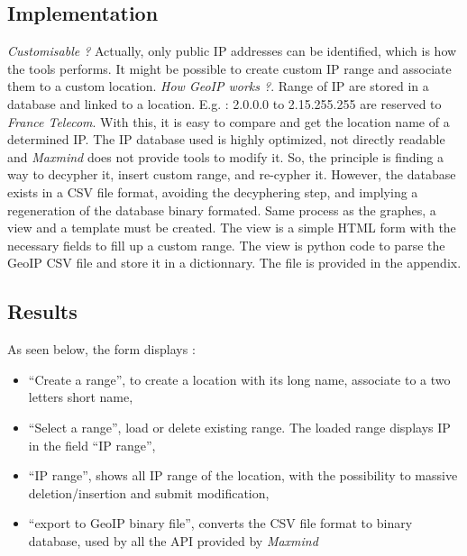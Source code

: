 \documentclass{koala-en}
\begin{document}
\subsection{Implementation}
\emph{Customisable ?}
Actually, only public IP addresses can be identified, which is how the tools performs. It might be possible to create custom IP range and associate them to a custom location.
\newline
\newline
\emph{How GeoIP works ?}. Range of IP are stored in a database and linked to a location. E.g. : 2.0.0.0 to 2.15.255.255 are reserved to \emph{France Telecom}. With this, it is easy to compare and get the location name of a determined IP. The IP database used is highly optimized, not directly readable and \emph{Maxmind} does not provide tools to modify it. So, the principle is finding a way to decypher it, insert custom range, and re-cypher it. However, the database exists in a CSV file format, avoiding the decyphering step, and implying a regeneration of the database binary formated.
\newline
\newline
Same process as the graphes, a view and a template must be created. The view is a simple HTML form with the necessary fields to fill up a custom range. The view is python code to parse the GeoIP CSV file and store it in a dictionnary. The file is provided in the appendix.

\subsection{Results}
As seen below, the form displays :
\begin{itemize}
  \item ``Create a range'', to create a location with its long name, associate to a two letters short name,
  \item ``Select a range'', load or delete existing range. The loaded range displays IP in the field ``IP range'',
  \item ``IP range'', shows all IP range of the location, with the possibility to massive deletion/insertion and submit modification,
  \item ``export to GeoIP binary file'', converts the CSV file format to binary database, used by all the API provided by \emph{Maxmind}
\end{itemize}
\end{document}
